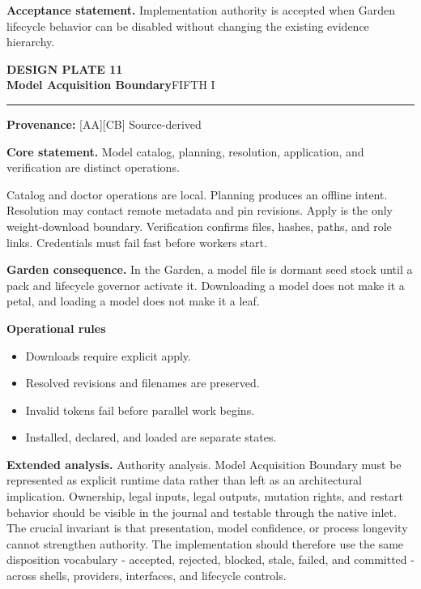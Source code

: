 \documentclass[10pt,letterpaper,oneside]{article}
\newcommand{\prov}[1]{\textcolor{gardenBlue}{\sffamily\footnotesize\textbf{Provenance:} #1}}
\newcommand{\platetitle}[3]{%
  \begin{minipage}[t][0.54in][t]{\textwidth}
  {\sffamily\bfseries\color{gardenDeep}\fontsize{9}{10}\selectfont DESIGN PLATE #1}\\[-1pt]
  {\sffamily\bfseries\color{gardenInk}\fontsize{16.5}{18}\selectfont #2}\hfill{\sffamily\color{gardenGreen}\large #3}
  \end{minipage}\vspace{-2pt}\hrule\vspace{5pt}}
\begin{document}
\begin{acceptbox}
\textbf{Acceptance statement.} Implementation authority is accepted when Garden lifecycle behavior can be disabled without changing the existing evidence hierarchy.
\end{acceptbox}
\newpage
\platetitle{11}{Model Acquisition Boundary}{FIFTH I}
\prov{[AA][CB] Source-derived}
\fontsize{8.85}{10.45}\selectfont
\begin{corebox}
\textbf{Core statement.} Model catalog, planning, resolution, application, and verification are distinct operations.
\end{corebox}
Catalog and doctor operations are local. Planning produces an offline intent. Resolution may contact remote metadata and pin revisions. Apply is the only weight-download boundary. Verification confirms files, hashes, paths, and role links. Credentials must fail fast before workers start.

\textbf{Garden consequence.} In the Garden, a model file is dormant seed stock until a pack and lifecycle governor activate it. Downloading a model does not make it a petal, and loading a model does not make it a leaf.

\textbf{Operational rules}
\begin{itemize}
\item Downloads require explicit apply.
\item Resolved revisions and filenames are preserved.
\item Invalid tokens fail before parallel work begins.
\item Installed, declared, and loaded are separate states.
\end{itemize}
\textbf{Extended analysis.} Authority analysis. Model Acquisition Boundary must be represented as explicit runtime data rather than left as an architectural implication. Ownership, legal inputs, legal outputs, mutation rights, and restart behavior should be visible in the journal and testable through the native inlet. The crucial invariant is that presentation, model confidence, or process longevity cannot strengthen authority. The implementation should therefore use the same disposition vocabulary - accepted, rejected, blocked, stale, failed, and committed - across shells, providers, interfaces, and lifecycle controls.
\end{document}
